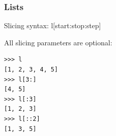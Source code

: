\documentclass[colorlinks]{beamer}
\begin{document}
\begin{frame}[fragile]\frametitle{Lists}
\begin{block}{}
Slicing syntax: l[start:stop:step]
\end{block}
\begin{block}{All slicing parameters are optional:}
\begin{verbatim}
>>> l
[1, 2, 3, 4, 5]
>>> l[3:]
[4, 5]
>>> l[:3]
[1, 2, 3]
>>> l[::2]
[1, 3, 5]
\end{verbatim}

\end{block}
\end{frame}
\end{document}

